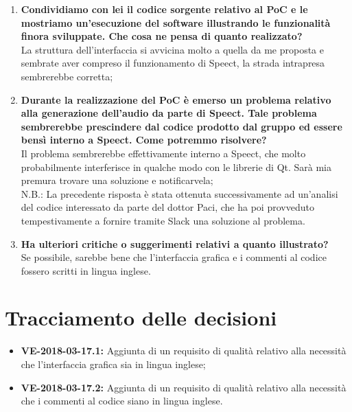 \documentclass[openany,12pt,a4paper]{article}
\begin{document}
  \begin{enumerate}
  	
  	\item \textbf{Condividiamo con lei il codice sorgente relativo al PoC e le mostriamo un'esecuzione del software illustrando le funzionalità finora sviluppate. Che cosa ne pensa di quanto realizzato?} \\
  	La struttura dell'interfaccia si avvicina molto a quella da me proposta e sembrate aver compreso il funzionamento di Speect, la strada intrapresa sembrerebbe corretta;
  	
  	\item \textbf{Durante la realizzazione del PoC è emerso un problema relativo alla generazione dell'audio da parte di Speect. Tale problema sembrerebbe prescindere dal codice prodotto dal gruppo ed essere bensì interno a Speect. Come potremmo risolvere?} \\  
  	Il problema sembrerebbe effettivamente interno a Speect, che molto probabilmente interferisce in qualche modo con le librerie di Qt. Sarà mia premura trovare una soluzione e notificarvela; \\
  	
  	N.B.: La precedente risposta è stata ottenuta successivamente ad un'analisi del codice interessato da parte del dottor Paci, che ha poi provveduto tempestivamente a fornire tramite Slack una soluzione al problema.
  	
  	\item \textbf{Ha ulteriori critiche o suggerimenti relativi a quanto illustrato?} \\
  	Se possibile, sarebbe bene che l'interfaccia grafica e i commenti al codice fossero scritti in lingua inglese.
  \end{enumerate} 
 
  \section{Tracciamento delle decisioni} 
   
  \begin{itemize} 
      \item \textbf{VE-2018-03-17.1:} Aggiunta di un requisito di qualità relativo alla necessità che l'interfaccia grafica sia in lingua inglese; 
      \item \textbf{VE-2018-03-17.2:} Aggiunta di un requisito di qualità relativo alla necessità che i commenti al codice siano in lingua inglese.
  \end{itemize} 
   
  
\end{document}
